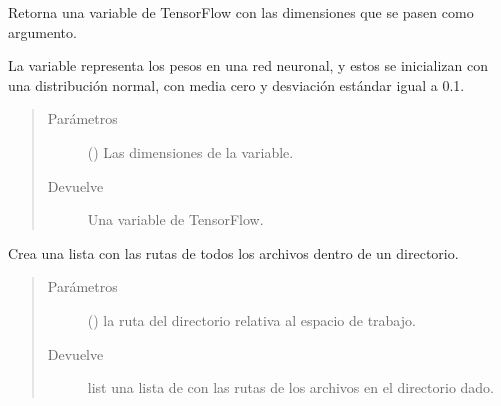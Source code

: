 
\begin{fulllineitems}
\label{\detokenize{model_desc:cnn_indoor_classifier_model.init_weights}}
Retorna una variable de TensorFlow con las dimensiones 
que se pasen como argumento.

La variable representa los pesos en una red neuronal,
y estos se inicializan con una distribución normal, 
con media cero y desviación estándar igual a 0.1.
\begin{quote}\begin{description}
\item[{Parámetros}] \leavevmode
{} () \textendash{} Las dimensiones de la variable.

\item[{Devuelve}] \leavevmode
Una variable de TensorFlow.

\end{description}\end{quote}

\end{fulllineitems}


\begin{fulllineitems}
\label{\detokenize{model_desc:cnn_indoor_classifier_model.list_files_in_directory}}
Crea una lista con las rutas de todos los archivos dentro de un
directorio.
\begin{quote}\begin{description}
\item[{Parámetros}] \leavevmode
{} () \textendash{} la ruta del directorio relativa al espacio de trabajo.

\item[{Devuelve}] \leavevmode
list \textendash{} una lista de con las rutas de los archivos en el directorio dado.

\end{description}\end{quote}

\end{fulllineitems}

